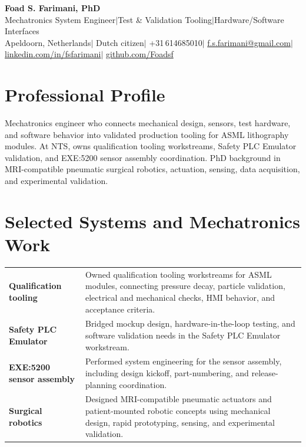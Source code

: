 \documentclass[11pt,a4paper]{article}
\begin{document}
\begin{center}
 {\LARGE\bfseries Foad S. Farimani, PhD} \\[4pt]
 {\small Mechatronics System Engineer\enspace$\mid$\enspace Test \& Validation Tooling\enspace$\mid$\enspace Hardware/Software Interfaces}
 \\[6pt]
 {\small
  Apeldoorn, Netherlands\enspace$\mid$\enspace
  Dutch citizen\enspace$\mid$\enspace
  +31\,614685010\enspace$\mid$\enspace
  \href{mailto:f.s.farimani@gmail.com}{f.s.farimani@gmail.com}\enspace$\mid$\enspace
  \href{https://linkedin.com/in/fsfarimani}{linkedin.com/in/fsfarimani}\enspace$\mid$\enspace
  \href{https://github.com/Foadsf}{github.com/Foadsf}
 }
\end{center}

\section{Professional Profile}
Mechatronics engineer who connects mechanical design, sensors, test hardware, and software behavior into validated production tooling for ASML lithography modules. At NTS, owns qualification tooling workstreams, Safety PLC Emulator validation, and EXE:5200 sensor assembly coordination. PhD background in MRI-compatible pneumatic surgical robotics, actuation, sensing, data acquisition, and experimental validation.

\section{Selected Systems and Mechatronics Work}
\begin{tabularx}{\textwidth}{@{}p{}X@{}}
\textbf{Qualification tooling} &
Owned qualification tooling workstreams for ASML modules, connecting pressure decay, particle validation, electrical and mechanical checks, HMI behavior, and acceptance criteria. \\[4pt]
\textbf{Safety PLC Emulator} &
Bridged mockup design, hardware-in-the-loop testing, and software validation needs in the Safety PLC Emulator workstream. \\[4pt]
\textbf{EXE:5200 sensor assembly} &
Performed system engineering for the sensor assembly, including design kickoff, part-numbering, and release-planning coordination. \\[4pt]
\textbf{Surgical robotics} &
Designed MRI-compatible pneumatic actuators and patient-mounted robotic concepts using mechanical design, rapid prototyping, sensing, and experimental validation. \\
\end{tabularx}
\end{document}
